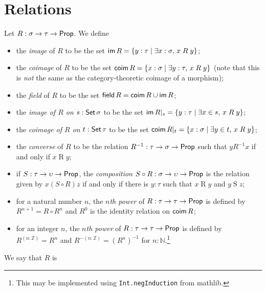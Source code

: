 \section{Relations}

\begin{definition}
  \label{def:relation_props}
  Let \( R : \sigma \to \tau \to \mathsf{Prop} \).
  We define
  \begin{itemize}
    \item the \emph{image} of \( R \) to be the set \( \operatorname{\mathsf{im}} R = \{ y : \tau \mid \exists x : \sigma,\, x \mathrel{R} y \} \);
    \item the \emph{coimage} of \( R \) to be the set \( \operatorname{\mathsf{coim}} R = \{ x : \sigma \mid \exists y : \tau,\, x \mathrel{R} y \} \) (note that this is \emph{not} the same as the category-theoretic coimage of a morphism);
    \item the \emph{field} of \( R \) to be the set \( \operatorname{\mathsf{field}} R = \operatorname{\mathsf{coim}} R \cup \operatorname{\mathsf{im}} R \);
    \item the \emph{image of \( R \) on} \( s : \operatorname{\mathsf{Set}} \sigma \) to be the set \( \operatorname{\mathsf{im}} R|_s = \{ y : \tau \mid \exists x \in s,\, x \mathrel{R} y \} \);
    \item the \emph{coimage of \( R \) on} \( t : \operatorname{\mathsf{Set}} \tau \) to be the set \( \operatorname{\mathsf{coim}} R|_t = \{ x : \sigma \mid \exists y \in t,\, x \mathrel{R} y \} \);
    \item the \emph{converse} of \( R \) to be the relation \( R^{-1} : \tau \to \sigma \to \mathsf{Prop} \) such that \( y \mathrel{R^{-1}} x \) if and only if \( x \mathrel{R} y \);
    \item if \( S : \tau \to \upsilon \to \mathsf{Prop} \), the \emph{composition} \( S \circ R : \sigma \to \upsilon \to \mathsf{Prop} \) is the relation given by \( x \mathrel{(S\circ R)} z \) if and only if there is \( y : \tau \) such that \( x \mathrel{R} y \) and \( y \mathrel{S} z \);
    \item for a natural number \( n \), the \emph{\( n \)th power} of \( R : \tau \to \tau \to \mathsf{Prop} \) is defined by \( R^{n+1} = R \circ R^n \) and \( R^0 \) is the identity relation on \( \operatorname{\mathsf{coim}} R \);
    \item for an integer \( n \), the \emph{\( n \)th power} of \( R : \tau \to \tau \to \mathsf{Prop} \) is defined by \( R^{(n : \mathbb Z)} = R^n \) and \( R^{-(n : \mathbb Z)} = (R^n)^{-1} \) for \( n : \mathbb N \).\footnote{This may be implemented using \texttt{Int.negInduction} from mathlib.}
  \end{itemize}
  We say that \( R \) is
  \begin{itemize}

\end{itemize}
\end{definition}
